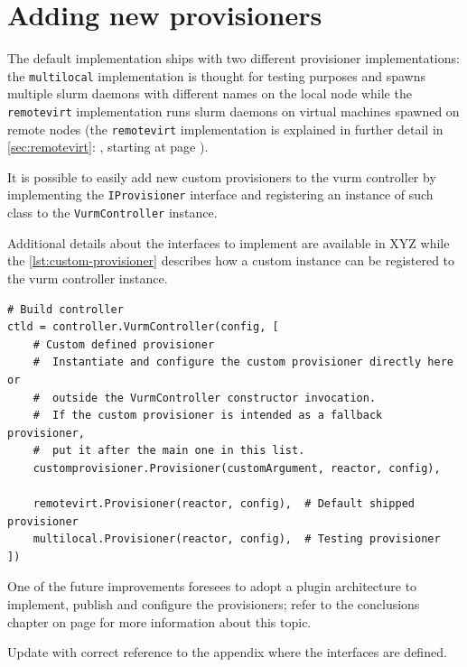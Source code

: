 \section{Adding new provisioners}

The default implementation ships with two different provisioner implementations: the \texttt{multilocal} implementation is thought for testing purposes and spawns multiple \gls{slurm} daemons with different names on the local node while the \texttt{remotevirt} implementation runs \gls{slurm} daemons on virtual machines spawned on remote nodes (the \texttt{remotevirt} implementation is explained in further detail in \autoref{sec:remotevirt}: \emph{}, starting at page \pageref{sec:remotevirt}).

It is possible to easily add new custom provisioners to the \gls{vurm} controller by implementing the \texttt{IProvisioner} interface and registering an instance of such class to the \texttt{VurmController} instance.

Additional details about the interfaces to implement are available in XYZ while the \autoref{lst:custom-provisioner} describes how a custom instance can be registered to the \gls{vurm} controller instance.

\begin{lstlisting}
# Build controller
ctld = controller.VurmController(config, [
    # Custom defined provisioner
    #  Instantiate and configure the custom provisioner directly here or
    #  outside the VurmController constructor invocation.
    #  If the custom provisioner is intended as a fallback provisioner,
    #  put it after the main one in this list.
    customprovisioner.Provisioner(customArgument, reactor, config),

    remotevirt.Provisioner(reactor, config),  # Default shipped provisioner
    multilocal.Provisioner(reactor, config),  # Testing provisioner
])
\end{lstlisting}

One of the future improvements foresees to adopt a plugin architecture to implement, publish and configure the provisioners; refer to the conclusions chapter on page \pageref{sec:future} for more information about this topic.

\begin{todo}
Update with correct reference to the appendix where the interfaces are defined.
\end{todo}
